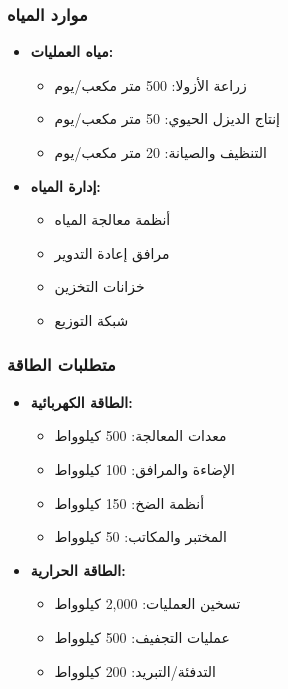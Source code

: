\subsubsection{موارد المياه}
\begin{itemize}
    \item \textbf{مياه العمليات:}
    \begin{itemize}
        \item زراعة الأزولا: 500 متر مكعب/يوم
        \item إنتاج الديزل الحيوي: 50 متر مكعب/يوم
        \item التنظيف والصيانة: 20 متر مكعب/يوم
    \end{itemize}
    
    \item \textbf{إدارة المياه:}
    \begin{itemize}
        \item أنظمة معالجة المياه
        \item مرافق إعادة التدوير
        \item خزانات التخزين
        \item شبكة التوزيع
    \end{itemize}
\end{itemize}

\subsubsection{متطلبات الطاقة}
\begin{itemize}
    \item \textbf{الطاقة الكهربائية:}
    \begin{itemize}
        \item معدات المعالجة: 500 كيلوواط
        \item الإضاءة والمرافق: 100 كيلوواط
        \item أنظمة الضخ: 150 كيلوواط
        \item المختبر والمكاتب: 50 كيلوواط
    \end{itemize}
    
    \item \textbf{الطاقة الحرارية:}
    \begin{itemize}
        \item تسخين العمليات: 2,000 كيلوواط
        \item عمليات التجفيف: 500 كيلوواط
        \item التدفئة/التبريد: 200 كيلوواط
    \end{itemize}
\end{itemize}

